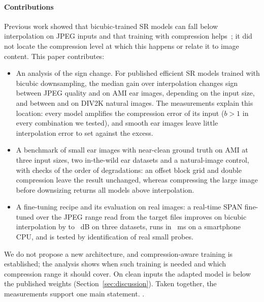 \paragraph{Contributions} Previous work showed that bicubic-trained SR models can fall below interpolation on JPEG inputs and that training with compression helps~\cite{chen2018cisrdcnn,zhang2021bsrgan,wang2021realesrgan}; it did not locate the compression level at which this happens or relate it to image content. This paper contributes:
\begin{itemize}
\item An analysis of the sign change. For \NPub{} published efficient SR models trained with bicubic downsampling, the median gain over interpolation changes sign between JPEG quality \CrossGridAmiLo{} and \CrossGridAmiHi{} on AMI ear images, depending on the input size, and between \CrossGridNatLo{} and \CrossGridNatHi{} on DIV2K natural images. The measurements explain this location: every model amplifies the compression error of its input ($b>1$ in every combination we tested), and smooth ear images leave little interpolation error to set against the excess.
\item A benchmark of small ear images with near-clean ground truth on AMI at three input sizes, two in-the-wild ear datasets and a natural-image control, with checks of the order of degradations: an offset block grid and double compression leave the result unchanged, whereas compressing the large image before downsizing returns all models above interpolation.
\item A fine-tuning recipe and its evaluation on real images: a real-time SPAN fine-tuned over the JPEG range read from the target files improves on bicubic interpolation by \EstVsBicMin{} to \EstVsBicMax{}~dB on three datasets, runs in \LatPhoneSpanCpu{}~ms on a smartphone CPU, and is tested by identification of real small probes.
\end{itemize}

We do not propose a new architecture, and compression-aware training is established; the analysis shows when such training is needed and which compression range it should cover. On clean inputs the adapted model is below the published weights (Section~\ref{sec:discussion}). Taken together, the measurements support one main statement. \KeyFinding.
